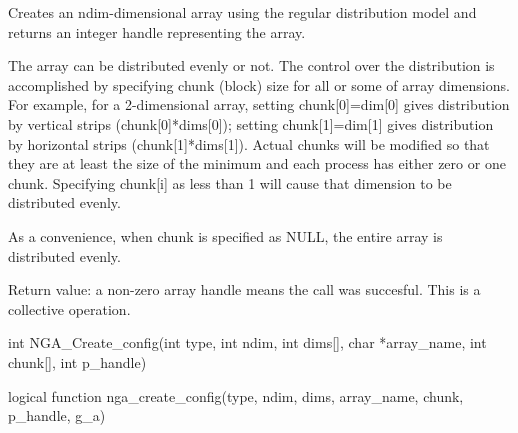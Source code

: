 \documentclass[12pt]{article}
\begin{document}
\dcoll

\begin{desc}

Creates an ndim-dimensional array using the regular distribution model and
returns an integer handle representing the array.

The array can be distributed evenly or not. The control over the distribution
is accomplished by specifying chunk (block) size for all or some of array
dimensions. For example, for a 2-dimensional array, setting chunk[0]=dim[0]
gives distribution by vertical strips (chunk[0]*dims[0]); setting
chunk[1]=dim[1] gives distribution by horizontal strips (chunk[1]*dims[1]).
Actual chunks will be modified so that they are at least the size of the
minimum and each process has either zero or one chunk. Specifying chunk[i] as
less than 1 will cause that dimension to be distributed evenly.

As a convenience, when chunk is specified as NULL, the entire array is
distributed evenly.

Return value: a non-zero array handle means the call was succesful.  This is a
collective operation.

\end{desc}


\begin{capi}
\begin{ccode}
int NGA_Create_config(int type, int ndim, int dims[], char *array_name,
                      int chunk[], int p_handle)
\end{ccode}
\begin{funcargs}
\end{funcargs}
\end{capi}

\begin{fapi}
\begin{fcode}
logical function nga_create_config(type, ndim, dims, array_name, chunk,
                                   p_handle, g_a)
\end{fcode}
\begin{funcargs}
\end{funcargs}
\end{fapi}
\end{document}
